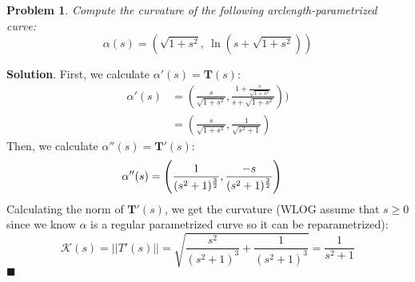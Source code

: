 \documentclass[12pt]{article}
\newcommand{\abs}[1]{\left| #1 \right|} %
\renewcommand{\=}[1]{\stackrel{#1}{=}} %
\newtheorem{p}{Problem}[section]
\theoremstyle{definition}
\newenvironment{s}{%
        \begin{trivlist} \item \textbf{Solution}. }{%
            \hspace*{\fill} $\blacksquare$\end{trivlist}}%
\begin{document}
\begin{p}
    Compute the curvature of the following arclength-parametrized curve:
    \[ \alpha(s) = (\sqrt{1+s^2},\: \ln(s+\sqrt{1+s^2})) \]
\end{p}
\begin{s}
    First, we calculate $\alpha'(s) = \mathbf{T}(s)$:
    \begin{align*}
        \alpha'(s) &= (\frac{s}{\sqrt{1+s^2}}, \frac{1+\frac{s}{\sqrt{1+s^2}}}{s+\sqrt{1+s^2}})) \\
        &= (\frac{s}{\sqrt{1+s^2}}, \frac{1}{\sqrt{s^2+1}})
    \end{align*}
    Then, we calculate $\alpha''(s) = \mathbf{T}'(s)$:
    \begin{align*}
        \alpha''(s) &= \Bigg{(}\frac{1}{(s^2+1)^{\frac{3}{2}}}, \frac{-s}{(s^2+1)^{\frac{3}{2}}}\Bigg{)}
    \end{align*}
    Calculating the norm of $\mathbf{T}'(s)$, we get the curvature (WLOG assume that $s \geq 0$ since we know
    $\alpha$ is a regular parametrized curve so it can be reparametrized): 
    \[ \mathcal{K}(s) = \abs{\abs{T'(s)}} = \sqrt{\frac{s^2}{(s^2+1)^3} + \frac{1}{(s^2+1)^3}} = \frac{1}{s^2+1}\]
\end{s}
\end{document}
